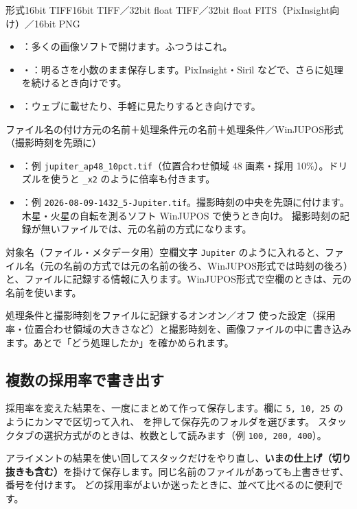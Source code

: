 \begin{setting}{ 形式}{16bit TIFF}{16bit TIFF／32bit float TIFF／32bit float FITS（PixInsight向け）／16bit PNG}
  \begin{itemize}[itemsep=0pt, topsep=2pt]
    \item {}：多くの画像ソフトで開けます。ふつうはこれ。
    \item {}・：明るさを小数のまま保存します。PixInsight・Siril などで、さらに処理を続けるとき向けです。
    \item {}：ウェブに載せたり、手軽に見たりするとき向けです。
  \end{itemize}
\end{setting}

\begin{setting}{ ファイル名の付け方}{元の名前＋処理条件}{元の名前＋処理条件／WinJUPOS形式（撮影時刻を先頭に）}
  \begin{itemize}[itemsep=0pt, topsep=2pt]
    \item {}：例 \texttt{jupiter\_ap48\_10pct.tif}（位置合わせ領域 48 画素・採用 10\%）。ドリズルを使うと \texttt{\_x2} のように倍率も付きます。
    \item {}：例 \texttt{2026-08-09-1432\_5-Jupiter.tif}。撮影時刻の中央を先頭に付けます。木星・火星の自転を測るソフト WinJUPOS で使うとき向け。
          撮影時刻の記録が無いファイルでは、元の名前の方式になります。
  \end{itemize}
\end{setting}

\begin{setting}{ 対象名（ファイル・メタデータ用）}{空欄}{文字}
  \texttt{Jupiter} のように入れると、ファイル名（元の名前の方式では元の名前の後ろ、WinJUPOS形式では時刻の後ろ）と、ファイルに記録する情報に入ります。WinJUPOS形式で空欄のときは、元の名前を使います。
\end{setting}

\begin{setting}{ 処理条件と撮影時刻をファイルに記録する}{オン}{オン／オフ}
  使った設定（採用率・位置合わせ領域の大きさなど）と撮影時刻を、画像ファイルの中に書き込みます。あとで「どう処理したか」を確かめられます。
\end{setting}

\subsection*{ 複数の採用率で書き出す}\label{sec:multiexport}

採用率を変えた結果を、一度にまとめて作って保存します。欄に \texttt{5, 10, 25} のようにカンマで区切って入れ、 を押して保存先のフォルダを選びます。
スタックタブの選択方式がのときは、枚数として読みます（例 \texttt{100, 200, 400}）。

アライメントの結果を使い回してスタックだけをやり直し、\textbf{いまの仕上げ（切り抜きも含む）}を掛けて保存します。同じ名前のファイルがあっても上書きせず、番号を付けます。
どの採用率がよいか迷ったときに、並べて比べるのに便利です。
